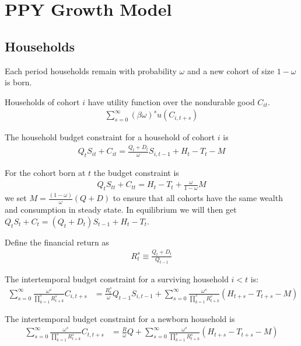 \documentclass[11pt]{article}
\begin{document}
\section{PPY Growth Model}

\subsection{Households}

Each period households remain with probability $\omega$ and a new cohort of size $1-\omega$ is born.

Households of cohort $i$ have utility function over the nondurable good $C_{it}$.
\begin{align*}
	\sum_{s=0}^{\infty}(\beta\omega)^s u(C_{i,t+s}) 
\end{align*}

The household budget constraint for a household of cohort $i$ is
\begin{align*}
    Q_t S_{it}+C_{it}   = \frac{Q_{t}+D_t}{\omega} S_{i,t-1}  + H_{t}  - T_{t} - M
\end{align*}

For the cohort born at $t$ the budget constraint is
\begin{align*}
    Q_t S_{tt}+C_{tt}   = H_{t}  - T_{t} + \frac{\omega}{1-\omega} M
\end{align*}
we set $ M = \frac{(1-\omega)}{\omega} (Q + D) $ to ensure that all cohorts have the same wealth and consumption in steady state.
In equilibrium we will then get $Q_t S_t+C_t = (Q_{t}+D_t) S_{t-1}+ H_t - T_t$.

Define the financial return as
\begin{align*}
    R_t^s \equiv \frac{Q_{t}+D_t}{Q_{t-1}}
\end{align*}

The intertemporal budget constraint for a surviving household $i<t$ is:
\begin{align*}
	\sum_{s=0}^{\infty}\frac{\omega^s}{\prod_{k=1}^{s}R_{t+k}^s} C_{i,t+s}  & = \frac{R_{t}^s}{\omega}Q_{t-1} S_{i,t-1} + \sum_{s=0}^{\infty}\frac{\omega^s}{\prod_{k=1}^{s}R_{t+k}^s}(H_{t+s}  - T_{t+s} - M)
\end{align*}

The intertemporal budget constraint for a newborn household is
\begin{align*}
	\sum_{s=0}^{\infty}\frac{\omega^s}{\prod_{k=1}^{s}R_{t+k}^s} C_{t,t+s}  & = \frac{R}{\omega}Q + \sum_{s=0}^{\infty}\frac{\omega^s}{\prod_{k=1}^{s}R_{t+k}^s}(H_{t+s}  - T_{t+s} - M)
\end{align*}
\end{document}
